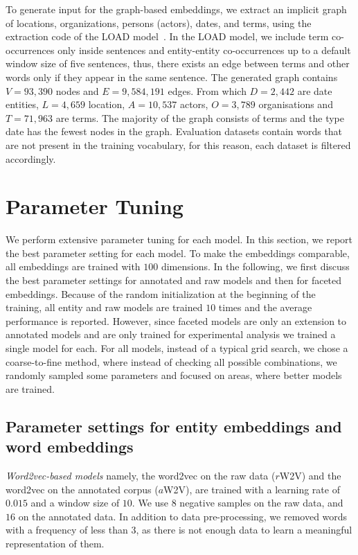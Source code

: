 To generate input for the graph-based embeddings, we extract an implicit graph of locations, organizations, persons (actors), dates, and terms, using the extraction code of the LOAD model~. In the LOAD model, we include term co-occurrences only inside sentences and entity-entity co-occurrences up to a default window size of five sentences, thus, there exists an edge between terms and other words only if they appear in the same sentence. The generated graph contains $V=93,390$ nodes and $E=9,584,191$ edges. From which $D=2,442$  are date entities, $L=4,659$ location, $A=10,537$ actors, $O=3,789$ organisations and $T=71,963$ are terms. The majority of the graph consists of terms and the type date has the fewest nodes in the graph. Evaluation datasets contain words that are not present in the training vocabulary, for this reason, each dataset is filtered accordingly.
\section{Parameter Tuning } \label{sec:setup}
We perform extensive parameter tuning for each model. In this section, we report the best parameter setting for each model. To make the embeddings comparable, all embeddings are trained with $100$ dimensions. In the following, we first discuss the best parameter settings for annotated and raw models and then for faceted embeddings. Because of the random initialization  at the beginning of the training, all entity and raw models are trained $10$ times and the average performance is reported. However, since faceted models are only an extension to annotated models and are only trained for experimental analysis we trained a single model for each. For all models, instead of a typical grid search, we chose a coarse-to-fine method, where instead of checking all possible combinations, we randomly sampled some parameters and focused on areas, where better models are trained.
\subsection{Parameter settings for entity embeddings and word embeddings}
 
\emph{Word2vec-based models} namely, the word2vec on the raw data ($r$W2V) and the word2vec on the annotated corpus ($a$W2V), are trained with a learning rate of $0.015$ and a window size of $10$. We use $8$ negative samples on the raw data, and $16$ on the annotated data. In addition to data pre-processing, we removed words with a frequency of less than $3$, as there is not enough data to learn a meaningful representation of them. \\

